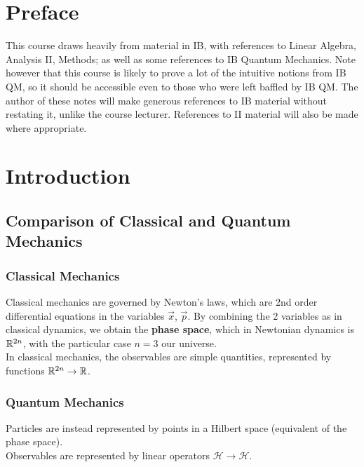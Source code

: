 

\def\ntitle{Principles of Quantum Mechanics}
\def\nauthor{mostanes}
\def\npart{II}
\def\nterm{Michelmas}
\def\nyear{2018}
\def\nlecturer{Skinner}

\renewcommand*{\H}{\mathcal{H}}


	
\mktitlepage
	
\newpage

\setcounter{section}{-1}

\section{Preface}
This course draws heavily from material in IB, with references to Linear Algebra, Analysis II, Methods; as well as some references to IB Quantum Mechanics. Note however that this course is likely to prove a lot of the intuitive notions from IB QM, so it should be accessible even to those who were left baffled by IB QM. The author of these notes will make generous references to IB material without restating it, unlike the course lecturer. References to II material will also be made where appropriate.

\newpage

\section{Introduction}
\subsection{Comparison of Classical and Quantum Mechanics}
\subsubsection{Classical Mechanics}
Classical mechanics are governed by Newton's laws, which are 2nd order differential equations in the variables $\vec{x}$, $\vec{p}$. By combining the 2 variables as in classical dynamics, we obtain the \textbf{phase space}, which in Newtonian dynamics is $\mathbb{R}^{2n}$, with the particular case $n=3$ our universe.\\
In classical mechanics, the observables are simple quantities, represented by functions $\mathbb{R}^{2n} \rightarrow \mathbb{R}$.

\subsubsection{Quantum Mechanics}
Particles are instead represented by points in a Hilbert space (equivalent of the phase space).\\
Observables are represented by linear operators $\H \rightarrow \H$.

